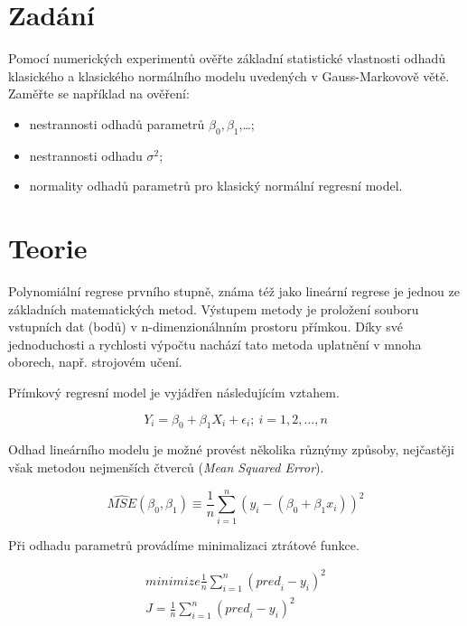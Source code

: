 \section{Zadání}

Pomocí numerických experimentů ověřte základní statistické vlastnosti odhadů klasického a klasického normálního modelu uvedených v Gauss-Markovově větě.
Zaměřte se například na ověření:

\begin{itemize}
    \item nestrannosti odhadů parametrů \( \beta_0, \beta_1 \),\ldots;
    \item nestrannosti odhadu \( \sigma^2 \);
    \item normality odhadů parametrů pro klasický normální regresní model.
\end{itemize}

\section{Teorie}

Polynomiální regrese prvního stupně, známa též jako lineární regrese je jednou ze základních matematických metod.
Výstupem metody je proložení souboru vstupních dat (bodů) v n-dimenzionálnním prostoru přímkou.
Díky své jednoduchosti a rychlosti výpočtu nachází tato metoda uplatnění v mnoha oborech, např. strojovém učení.

Přímkový regresní model je vyjádřen následujícím vztahem.

\begin{equation}
    Y_i = \beta_0 + \beta_1 X_i + \epsilon_i; \: i = 1,2,\ldots,n
\end{equation}

Odhad lineárního modelu je možné provést několika různýmy způsoby, nejčastěji však metodou nejmenších čtverců (\textit{Mean Squared Error}).

\begin{equation}
    \widehat{MSE}(\beta_0, \beta_1) \equiv \frac{1}{n}\sum_{i=1}^{n}{(y_i - (\beta_0 + \beta_1 x_i))^2}
\end{equation}

Při odhadu parametrů provádíme minimalizaci ztrátové funkce.

\begin{align}
    {minimize} \frac{1}{n} \sum_{i = 1}^{n} ({pred}_i - y_i)^2 \\
    J = \frac{1}{n} \sum_{i = 1}^{n} ({pred}_i - y_i)^2
\end{align}

